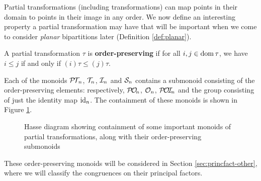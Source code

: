 Partial transformations (including transformations) can map points in their
domain to points in their image in any order.  We now define an interesting
property a partial transformation may have that will be important when we come
to consider \textit{planar} bipartitions later (Definition \ref{def:planar}).

\begin{definition}
  \label{def:order-preserving}
  A partial transformation $\tau$ is \textbf{order-preserving} if for all
  $i,j \in \operatorname{dom}\tau$, we have $i \leq j$ if and only if $(i)\tau \leq (j)\tau$.
\end{definition}

Each of the monoids $\mathcal{P\!T\!}_n$, $\mathcal{T}_n$, $\mathcal{I}_n$ and $\mathcal{S}_n$ contains a submonoid
consisting of the order-preserving elements: respectively, $\mathcal{P\!O\!}_n$, $\mathcal{O}_n$,
$\mathcal{P\!O\!I\!}_n$ and the group consisting of just the identity map $\operatorname{id}_n$.  The
containment of these monoids is shown in Figure \ref{fig:ord-pres}.

\begin{figure}[ht]
  \centering
  \caption[Important monoids of partial transformations]{Hasse diagram showing
    containment of some important monoids of partial transformations, along with
    their order-preserving submonoids}
  \label{fig:ord-pres}
\end{figure}

These order-preserving monoids will be considered in Section
\ref{sec:princfact-other}, where we will classify the congruences on their
principal factors.

